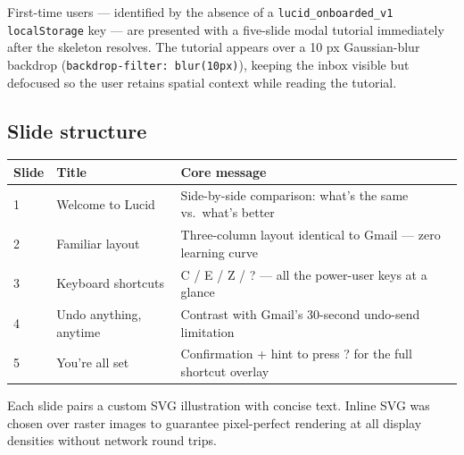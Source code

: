 \documentclass[12pt,a4paper]{report}
\begin{document}
{{First-time users — identified by the absence of a \texttt{lucid\_onboarded\_v1}
\texttt{localStorage} key — are presented with a five-slide modal tutorial immediately after
the skeleton resolves. The tutorial appears over a 10 px Gaussian-blur backdrop
(\texttt{backdrop-filter: blur(10px)}), keeping the inbox visible but defocused so the
user retains spatial context while reading the tutorial.

\subsection*{Slide structure}

\begin{center}
\begin{tabular}{@{}lll@{}}
  \toprule
  \textbf{Slide} & \textbf{Title} & \textbf{Core message} \\
  \midrule
  1 & Welcome to Lucid        & Side-by-side comparison: what's the same vs.\ what's better \\
  2 & Familiar layout         & Three-column layout identical to Gmail — zero learning curve \\
  3 & Keyboard shortcuts      & C / E / Z / ? — all the power-user keys at a glance \\
  4 & Undo anything, anytime  & Contrast with Gmail's 30-second undo-send limitation \\
  5 & You're all set          & Confirmation + hint to press ? for the full shortcut overlay \\
  \bottomrule
\end{tabular}
\end{center}

Each slide pairs a custom SVG illustration with concise text. Inline SVG was chosen over
raster images to guarantee pixel-perfect rendering at all display densities without
network round trips.

}}
\end{document}
